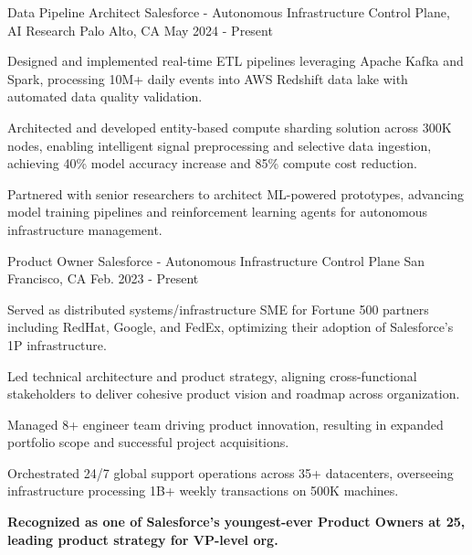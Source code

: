 

\renewcommand{\baselinestretch}{1.3} 
\begin{cventries}
  \cventry
    {Data Pipeline Architect}
    {Salesforce - Autonomous Infrastructure Control Plane, AI Research}
    {Palo Alto, CA}
    {May 2024 - Present}
    {
      \begin{cvitems}
        \item {Designed and implemented real-time ETL pipelines leveraging Apache Kafka and Spark, processing 10M+ daily events into AWS Redshift data lake with automated data quality validation.}
        \item {Architected and developed entity-based compute sharding solution across 300K nodes, enabling intelligent signal preprocessing and selective data ingestion, achieving 40\% model accuracy increase and 85\% compute cost reduction.}
        \item {Partnered with senior researchers to architect ML-powered prototypes, advancing model training pipelines and reinforcement learning agents for autonomous infrastructure management.}
      \end{cvitems}
    }

  \cventry
    {Product Owner}
    {Salesforce - Autonomous Infrastructure Control Plane}
    {San Francisco, CA}
    {Feb. 2023 - Present}
    {
      \begin{cvitems}
        \item {Served as distributed systems/infrastructure SME for Fortune 500 partners including RedHat, Google, and FedEx, optimizing their adoption of Salesforce's 1P infrastructure.}
        \item {Led technical architecture and product strategy, aligning cross-functional stakeholders to deliver cohesive product vision and roadmap across organization.}
        \item {Managed 8+ engineer team driving product innovation, resulting in expanded portfolio scope and successful project acquisitions.}
        \item {Orchestrated 24/7 global support operations across 35+ datacenters, overseeing infrastructure processing 1B+ weekly transactions on 500K machines.}
        \item {\textbf{Recognized as one of Salesforce's youngest-ever Product Owners at 25, leading product strategy for VP-level org.}}
      \end{cvitems}
    }


\end{cventries}
